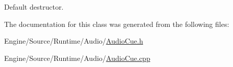 Default destructor. 

The documentation for this class was generated from the following files\+:\begin{DoxyCompactItemize}
\item 
Engine/\+Source/\+Runtime/\+Audio/\mbox{\hyperlink{_audio_cue_8h}{Audio\+Cue.\+h}}\item 
Engine/\+Source/\+Runtime/\+Audio/\mbox{\hyperlink{_audio_cue_8cpp}{Audio\+Cue.\+cpp}}\end{DoxyCompactItemize}
